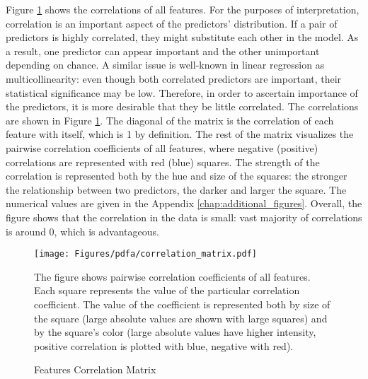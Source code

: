 		Figure \ref{fig:correlation_matrix} shows the correlations of all features. For the purposes of interpretation, correlation is an important aspect of the predictors' distribution. If a pair of predictors is highly correlated, they might substitute each other in the model. As a result, one predictor can appear important and the other unimportant depending on chance. A similar issue is well-known in linear regression as multicollinearity: even though both correlated predictors are important, their statistical significance may be low. Therefore, in order to ascertain importance of the predictors, it is more desirable that they be little correlated. The correlations are shown in Figure \ref{fig:correlation_matrix}. The diagonal of the matrix is the correlation of each feature with itself, which is 1 by definition. The rest of the matrix visualizes the pairwise correlation coefficients of all features, where negative (positive) correlations are represented with red (blue) squares. The strength of the correlation is represented both by the hue and size of the squares: the stronger the relationship between two predictors, the darker and larger the square. The numerical values are given in the Appendix \ref{chap:additional_figures}. Overall, the figure shows that the correlation in the data is small: vast majority of correlations is around 0, which is advantageous.
		\begin{center}
			\begin{figure}[!htb]
				\texttt{[image: Figures/pdfa/correlation\_matrix.pdf]}
				\caption{Features Correlation Matrix}
				\label{fig:correlation_matrix}
				\medskip
				\small 
				The figure shows pairwise correlation coefficients of all features. Each square represents the value of the particular correlation coefficient. The value of the coefficient is represented both by size of the square (large absolute values are shown with large squares) and by the square's color (large absolute values have higher intensity, positive correlation is plotted with blue, negative with red).
			\end{figure}
		\end{center}  
		
